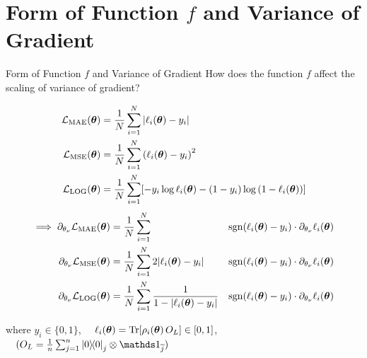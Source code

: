 \documentclass[dvipdfmx,10pt,aspectratio=169]{beamer}
\begin{document}
\section{Form of Function $f$ and Variance of Gradient}
\begin{frame}{Form of Function $f$ and Variance of Gradient}
    How does the function $f$ affect the scaling of variance of gradient?
    \begin{footnotesize}
        \begin{align*}
            \mathcal{L}_{\mathrm{MAE}}(\vb*{\theta}) &= \frac1N\sum_{i=1}^N \abs{\ell_i(\vb*{\theta}) - y_i} \\
            \mathcal{L}_{\mathrm{MSE}}(\vb*{\theta}) &= \frac1N\sum_{i=1}^N \qty(\ell_i(\vb*{\theta}) - y_i)^2 \\
            \mathcal{L}_{\mathrm{LOG}}(\vb*{\theta}) &= \frac1N\sum_{i=1}^N [-y_i \log{\ell_i(\vb*{\theta})} - (1-y_i)\log{(1-\ell_i(\vb*{\theta}))}] \\
        \end{align*}
        \vspace{-25pt}
        \begin{alignat*}{2}
            \implies
            \partial_{\theta_\nu} \mathcal{L}_{\mathrm{MAE}}(\vb*{\theta}) &= \frac1N\sum_{i=1}^N &\operatorname{sgn}(\ell_i(\vb*{\theta}) - y_i) \cdot\partial_{\theta_\nu} \ell_i(\vb*{\theta}) \\
            \partial_{\theta_\nu} \mathcal{L}_{\mathrm{MSE}}(\vb*{\theta}) &= \frac1N\sum_{i=1}^N 2|\ell_i(\vb*{\theta}) - y_i| &\operatorname{sgn}(\ell_i(\vb*{\theta}) - y_i)\cdot\partial_{\theta_\nu} \ell_i(\vb*{\theta}) \\
            \partial_{\theta_\nu} \mathcal{L}_{\mathrm{LOG}}(\vb*{\theta}) &= \frac1N\sum_{i=1}^N \frac{1}{1 - |\ell_i(\vb*{\theta}) - y_i|} &\operatorname{sgn}(\ell_i(\vb*{\theta}) - y_i) \cdot\partial_{\theta_\nu} \ell_i(\vb*{\theta}) 
        \end{alignat*}
    \end{footnotesize}
    \begin{center}
        where $y_i \in \{0,1\}$, $\quad \ell_i(\vb*{\theta}) = \Tr[\rho_i(\vb*{\theta})\,O_L] \in [0,1]$,   $\quad (O_L = \frac1n \sum_{j=1}^{n}\dyad{0}_{j} \otimes \bbid_{\bar{j}})$
    \end{center}
\end{frame}
\end{document}
